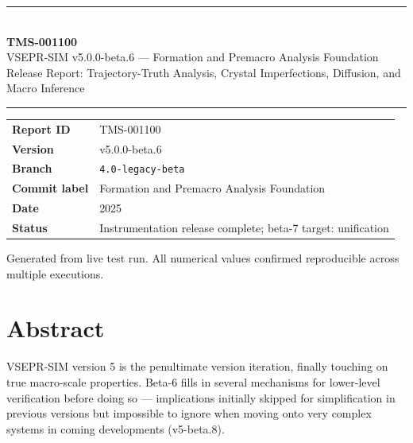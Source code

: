 \documentclass[11pt,a4paper]{article}
\begin{document}
\begin{titlepage}
\vspace*{3cm}
{\color{vseprdark}\rule{\linewidth}{1.5pt}}\\[0.6em]
{\Huge\bfseries\color{vseprdark} TMS-001100}\\[0.3em]
{\large\color{vsepraccentblue} VSEPR-SIM v5.0.0-beta.6 --- Formation and Premacro Analysis Foundation}\\[0.2em]
{\normalsize\color{gray} Release Report: Trajectory-Truth Analysis, Crystal Imperfections, Diffusion, and Macro Inference}\\[0.4em]
{\color{vseprdark}\rule{\linewidth}{0.6pt}}

\vspace{2em}

\begin{tabular}{ll}
\textbf{Report ID}    & TMS-001100 \\[0.3em]
\textbf{Version}      & v5.0.0-beta.6 \\[0.3em]
\textbf{Branch}       & \texttt{4.0-legacy-beta} \\[0.3em]
\textbf{Commit label} & Formation and Premacro Analysis Foundation \\[0.3em]
\textbf{Date}         & 2025 \\[0.3em]
\textbf{Status}       & Instrumentation release complete; beta-7 target: unification \\
\end{tabular}

\vfill
{\color{gray}\small Generated from live test run. All numerical values confirmed reproducible across multiple executions.}
\end{titlepage}

\tableofcontents
\newpage

\section{Abstract}

VSEPR-SIM version 5 is the penultimate version iteration, finally touching on true macro-scale
properties. Beta-6 fills in several mechanisms for lower-level verification before doing
so --- implications initially skipped for simplification in previous versions but impossible to
ignore when moving onto very complex systems in coming developments (v5-beta.8).
\end{document}
